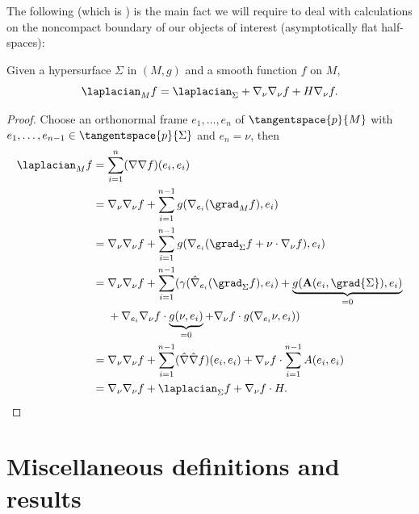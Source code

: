\documentclass[titlepage,numbers=noenddot,oneside,%
cleardoublepage=empty,paper=a4,fontsize=11pt,%
english,%
]{scrartcl}
\begin{document}
{The following (which is \cite[Exercise 2.3 in][]{leeGeometricRelativity2019}) is the main fact we will require to deal with calculations on the noncompact boundary of our objects of interest (asymptotically flat half-spaces):
\begin{fact}\label{fact:laplacian_and_hypersurface_laplacian}
    Given a hypersurface \( \Sigma \) in \( (M,g) \) and a smooth function \( f \) on \( M \),
    \begin{equation*}
        \laplacian_M f=\laplacian_\Sigma +\Mconnection_\nu\Mconnection_\nu f+H \Mconnection_\nu f.
    \end{equation*}
\end{fact}
\begin{proof}
    Choose an orthonormal frame \( e_1,\dotsc,e_n \) of \( \tangentspace{p}{M} \) with \( e_1,\dotsc,e_{n-1}\in \tangentspace{p}{\Sigma} \) and \( e_n=\nu \), then
    \begin{align*}
        \laplacian_M f&=\sum_{i=1}^{n}(\Mconnection\Mconnection f)(e_i,e_i)\\
        &=\Mconnection_\nu \Mconnection_\nu f+\sum_{i=1}^{n-1}g(\Mconnection_{e_i} (\grad_M f),e_i)\\
        &=\Mconnection_\nu \Mconnection_\nu f+\sum_{i=1}^{n-1}g(\Mconnection_{e_i}(\grad_{\Sigma}f+\nu\cdot \Mconnection_\nu f),e_i)\\
        &=\begin{aligned}[t]
            &\Mconnection_\nu \Mconnection_\nu f+\sum_{i=1}^{n-1}(\gamma(\Sigmaconnection_{e_i}(\grad_{\Sigma} f),e_i)+\underbrace{g(\mathbf{A}(e_i,\grad{\Sigma}),e_i)}_{=0}\\
            &+\Mconnection_{
        e_i}\Mconnection_{\nu}f\cdot \underbrace{g(\nu,e_i)}_{=0}+\Mconnection_{\nu}f\cdot g(\Mconnection_{e_i}\nu,e_i))
        \end{aligned}\\
        &=\Mconnection_\nu \Mconnection_\nu f+\sum_{i=1}^{n-1}(\Sigmaconnection\Sigmaconnection f)(e_i,e_i)+\Mconnection_\nu f\cdot \sum_{i=1}^{n-1}A(e_i,e_i)\\
        &=\Mconnection_\nu \Mconnection_\nu f+\laplacian_{\Sigma}f+\Mconnection_{\nu}f\cdot H.
    \end{align*}
\end{proof}
}
\section{Miscellaneous definitions and results}\label{sec:miscellaneous}
\end{document}
